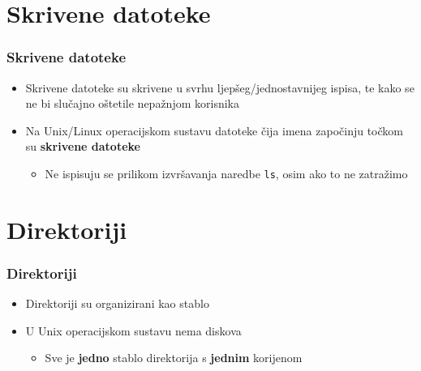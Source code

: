 \documentclass{beamer}
\begin{document}
\section{Skrivene datoteke}
\begin{frame}[t]
\frametitle{Skrivene datoteke}
\begin{itemize}
  \item Skrivene datoteke su skrivene u svrhu ljepšeg/jednostavnijeg ispisa, te kako se ne bi slučajno oštetile nepažnjom korisnika
  \item Na Unix/Linux operacijskom sustavu datoteke čija imena započinju
        točkom su \textbf{skrivene datoteke}
  \begin{itemize}
    \item Ne ispisuju se prilikom izvršavanja naredbe \texttt{ls}, osim
          ako to ne zatražimo
  \end{itemize}
\end{itemize}
\end{frame}

\section{Direktoriji}
\begin{frame}[t]
\frametitle{Direktoriji}
\begin{itemize}
  \item Direktoriji su organizirani kao stablo
  \item U Unix operacijskom sustavu nema diskova
  \begin{itemize}
    \item Sve je \textbf{jedno} stablo direktorija s \textbf{jednim}
          korijenom
  \end{itemize}
  \centering
\end{itemize}
\end{frame}
\end{document}

